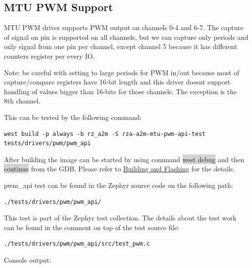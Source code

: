 \documentclass[11pt,a4paper,oneside]{article}
\begin{document}
\subsection{MTU PWM Support}\label{mtu-pwm-support}

MTU PWM driver supports PWM output on channels 0-4 and 6-7. The capture
of signal on pin is supported on all channels, but we can capture only
periods and only signal from one pin per channel, except channel 5
because it has different counters register per every IO.

Note: be careful with setting to large periods for PWM in/out because
most of capture/compare registers have 16-bit length and this driver
doesn\textquotesingle t support handling of values bigger than 16-bits
for those channels. The exception is the 8th channel.

This can be tested by the following command:

\begin{lstlisting}
west build -p always -b rz_a2m -S rza-a2m-mtu-pwm-api-test
tests/drivers/pwm/pwm_api
\end{lstlisting}

After building the image can be started by using command \colorbox{lightgray}{west debug}
and then \colorbox{lightgray}{continue} from the GDB. Please refer to
\hyperref[building-and-flashing]{Building and Flashing} for the
details.

pwm\_api test can be found in the Zephyr source code on the following
path:

\begin{lstlisting}
./tests/drivers/pwm/pwm_api/
\end{lstlisting}

This test is part of the Zephyr test collection. The details about the
test work can be found in the comment on top of the test source file:
\begin{lstlisting}
./tests/drivers/pwm/pwm_api/src/test_pwm.c
\end{lstlisting}

Console output:
\end{document}
